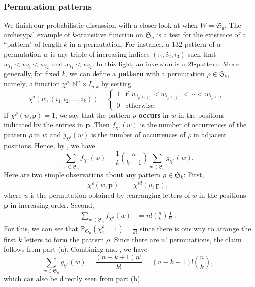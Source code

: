 \documentclass{amsart}
\newcommand{\N}{\mathbb{N}}
\renewcommand{\P}{\mathbb{P}}
\renewcommand{\S}{\mathfrak{S}}
\newcommand{\eqpd}{\, .}
\theoremstyle{definition}
\begin{document}
\subsubsection{Permutation patterns} We finish our probabilistic discussion with a closer look 
at when $W=\S_n$. The archetypal example of $k$-transitive function  on $\S_n$ is a test for the existence of a ``pattern'' of length $k$ in a permutation. 
For instance, a $132$-pattern of a permutation $w$ is any triple of increasing indices $(i_1,i_2,i_3)$ such that $w_{i_1}<w_{i_3}<w_{i_2}$ and $w_{i_1}<w_{i_2}$. 
In this light, an inversion is a $21$-pattern. 
More generally, for fixed $k$, we can define a \textbf{pattern} with a permutation $\rho\in \S_k$, namely, a function $\chi^\rho:\N^n\times I_{n,k}$ by setting
     \[\chi^\rho(w,(i_1,i_2,\dots,i_k))=\begin{cases}
         1&\text{if }w_{i_{\rho^{-1}(1)}}< w_{i_{\rho^{-1}(2)}}<\cdots< w_{i_{\rho^{-1}(k)}}\\
         0&\text{otherwise}.
     \end{cases}\]
    If $\chi^\rho(w,\textbf{p})=1$, we say that the pattern $\rho$ \textbf{occurs} in $w$ in the positions indicated by the entries in $\textbf{p}$. 
    Then $f_{\chi^\rho}(w)$ is the number of occurrences of the pattern $\rho$ in $w$ and $g_{\chi^\rho}(w)$ is the number of occurrences of $\rho$ in adjacent positions. 
    Hence, by , we have
     \begin{equation}
         \sum_{w\in \S_n} f_{\chi^\rho}(w)=\frac{1}{k}\binom{n}{k-1}\sum_{w\in \S_n} g_{\chi^\rho}(w).\label{eq:pattern-inv-des}
     \end{equation}
 Here are two simple observations about any pattern $\rho\in \S_k$: First,
 \begin{align}
     \label{eq:k-equidistribution}\chi^{\rho}(w,\textbf{p})&=\chi^{id}(u,\textbf{p}),\end{align}
     where $u$ is the permutation obtained by rearranging letters of $w$ in the positions  $\textbf{p}$ in increasing order. Second,
     \begin{align}
     \sum_{w\in \S_n} f_{\chi^\rho}(w)&=n!\binom{n}{k}\frac{1}{k!}\eqpd\label{eq:total-num-patterns}
 \end{align}
    For this, we can see that $\P_{\S_n}(\chi^{\rho}_1=1)=\frac{1}{k!}$ since there is one way to arrange the first $k$ letters to form the pattern $\rho$. 
    Since there are $n!$ permutations, the claim follows from  part (a). 
    Combining  and , we have 
    \begin{equation}\label{eq:total-num-adj-patterns}
        \sum_{w\in \S_n}g_{\chi^\rho}(w)=\frac{(n-k+1)n!}{k!}=(n-k+1)!\binom{n}{k},
    \end{equation}
    which can also be directly seen from  part (b).
\end{document}
